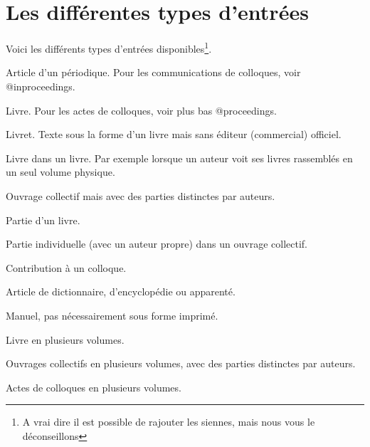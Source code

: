 \section{Les différentes types d'entrées}
Voici les différents types d'entrées disponibles\footnote{A vrai dire il est possible de rajouter les siennes, mais nous vous le déconseillons}.


\begin{fieldlist}

Article d'un périodique. Pour les communications de colloques, voir @inproceedings.

Livre. Pour les actes de colloques, voir plus bas @proceedings. 

	
	Livret. Texte sous la forme d'un livre mais sans éditeur (commercial) officiel.
	
	
	Livre dans un livre. Par exemple lorsque un auteur  voit ses livres rassemblés en un seul volume physique. 	
	
	
	Ouvrage collectif mais avec des parties distinctes par auteurs.
	
	
	Partie d'un livre.
	
	
	Partie individuelle (avec un auteur propre) dans un ouvrage collectif.
	
	 
	 Contribution à un colloque.
	 

		 
	 
	 Article de dictionnaire, d'encyclopédie ou apparenté.
	 

	
	 Manuel, pas nécessairement sous forme imprimé.
	 
	 Livre en plusieurs volumes.
	 
	 
	 Ouvrages collectifs en plusieurs volumes, avec des parties distinctes par auteurs.
	 
	 
	 Actes de colloques en plusieurs volumes.
	 

\end{fieldlist}
